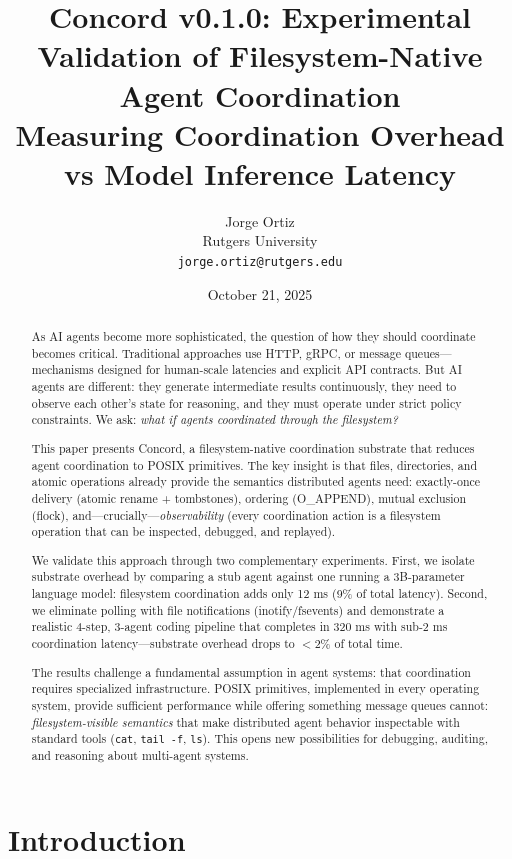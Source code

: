 \documentclass[11pt]{article}
\title{\textbf{Concord v0.1.0: Experimental Validation of Filesystem-Native Agent Coordination}\\
\large Measuring Coordination Overhead vs Model Inference Latency}
\author{
Jorge Ortiz\\
Rutgers University\\
\texttt{jorge.ortiz@rutgers.edu}
}
\date{October 21, 2025}
\begin{document}
\maketitle

\begin{abstract}
As AI agents become more sophisticated, the question of how they should coordinate becomes critical. Traditional approaches use HTTP, gRPC, or message queues---mechanisms designed for human-scale latencies and explicit API contracts. But AI agents are different: they generate intermediate results continuously, they need to observe each other's state for reasoning, and they must operate under strict policy constraints. We ask: \emph{what if agents coordinated through the filesystem?}

This paper presents Concord, a filesystem-native coordination substrate that reduces agent coordination to POSIX primitives. The key insight is that files, directories, and atomic operations already provide the semantics distributed agents need: exactly-once delivery (atomic rename + tombstones), ordering (O\_APPEND), mutual exclusion (flock), and---crucially---\emph{observability} (every coordination action is a filesystem operation that can be inspected, debugged, and replayed).

We validate this approach through two complementary experiments. First, we isolate substrate overhead by comparing a stub agent against one running a 3B-parameter language model: filesystem coordination adds only 12 ms (9\% of total latency). Second, we eliminate polling with file notifications (inotify/fsevents) and demonstrate a realistic 4-step, 3-agent coding pipeline that completes in 320 ms with sub-2 ms coordination latency---substrate overhead drops to $<$2\% of total time.

The results challenge a fundamental assumption in agent systems: that coordination requires specialized infrastructure. POSIX primitives, implemented in every operating system, provide sufficient performance while offering something message queues cannot: \emph{filesystem-visible semantics} that make distributed agent behavior inspectable with standard tools (\texttt{cat}, \texttt{tail -f}, \texttt{ls}). This opens new possibilities for debugging, auditing, and reasoning about multi-agent systems.
\end{abstract}

\section{Introduction}
\end{document}
